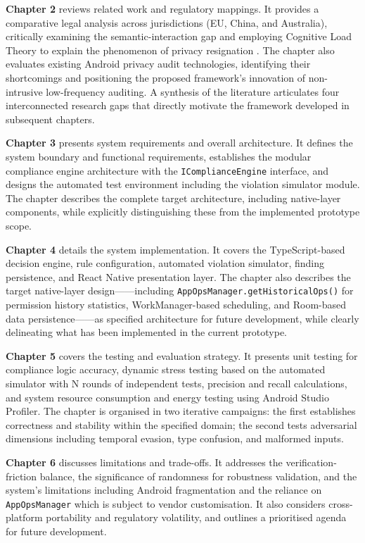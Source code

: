 \textbf{Chapter 2} reviews related work and regulatory mappings. It provides a comparative legal analysis across jurisdictions (EU, China, and Australia), critically examining the semantic-interaction gap and employing Cognitive Load Theory to explain the phenomenon of privacy resignation \cite{dehling2015, choi2018}. The chapter also evaluates existing Android privacy audit technologies, identifying their shortcomings and positioning the proposed framework's innovation of non-intrusive low-frequency auditing. A synthesis of the literature articulates four interconnected research gaps that directly motivate the framework developed in subsequent chapters.

\textbf{Chapter 3} presents system requirements and overall architecture. It defines the system boundary and functional requirements, establishes the modular compliance engine architecture with the \texttt{IComplianceEngine} interface, and designs the automated test environment including the violation simulator module. The chapter describes the complete target architecture, including native-layer components, while explicitly distinguishing these from the implemented prototype scope.

\textbf{Chapter 4} details the system implementation. It covers the TypeScript-based decision engine, rule configuration, automated violation simulator, finding persistence, and React Native presentation layer. The chapter also describes the target native-layer design——including \texttt{AppOpsManager.getHistoricalOps()} for permission history statistics, WorkManager-based scheduling, and Room-based data persistence——as specified architecture for future development, while clearly delineating what has been implemented in the current prototype.

\textbf{Chapter 5} covers the testing and evaluation strategy. It presents unit testing for compliance logic accuracy, dynamic stress testing based on the automated simulator with N rounds of independent tests, precision and recall calculations, and system resource consumption and energy testing using Android Studio Profiler. The chapter is organised in two iterative campaigns: the first establishes correctness and stability within the specified domain; the second tests adversarial dimensions including temporal evasion, type confusion, and malformed inputs.

\textbf{Chapter 6} discusses limitations and trade-offs. It addresses the verification-friction balance, the significance of randomness for robustness validation, and the system's limitations including Android fragmentation and the reliance on \texttt{AppOpsManager} which is subject to vendor customisation. It also considers cross-platform portability and regulatory volatility, and outlines a prioritised agenda for future development.


